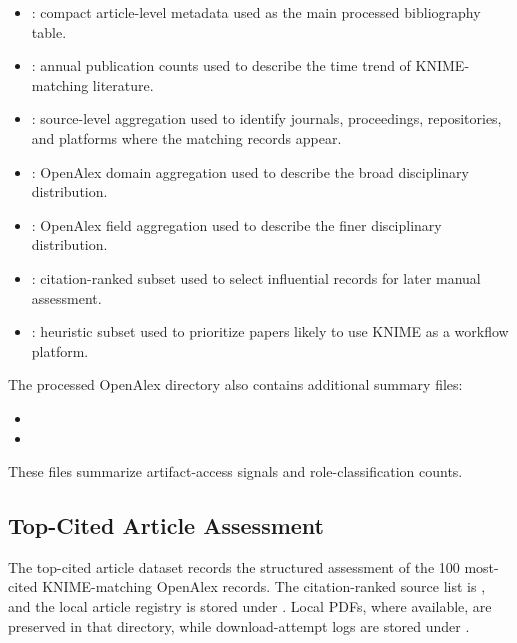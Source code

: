 \documentclass[runningheads]{llncs}
\begin{document}
\begin{itemize}
\item {}: compact article-level
metadata used as the main processed bibliography table.
\item {}: annual publication
counts used to describe the time trend of KNIME-matching literature.
\item {}: source-level aggregation
used to identify journals, proceedings, repositories, and platforms where the
matching records appear.
\item {}: OpenAlex domain
aggregation used to describe the broad disciplinary distribution.
\item {}: OpenAlex field
aggregation used to describe the finer disciplinary distribution.
\item {}: citation-ranked subset
used to select influential records for later manual assessment.
\item {}: heuristic
subset used to prioritize papers likely to use KNIME as a workflow platform.
\end{itemize}

The processed OpenAlex directory also contains additional summary files:
\begin{itemize}
\item {}
\item {}
\end{itemize}
These files summarize artifact-access signals and role-classification counts.

\subsection{Top-Cited Article Assessment}

The top-cited article dataset records the structured assessment of the 100
most-cited KNIME-matching OpenAlex records. The citation-ranked source list is
, and the local
article registry is stored under . Local PDFs,
where available, are preserved in that directory, while download-attempt logs
are stored under .
\end{document}
